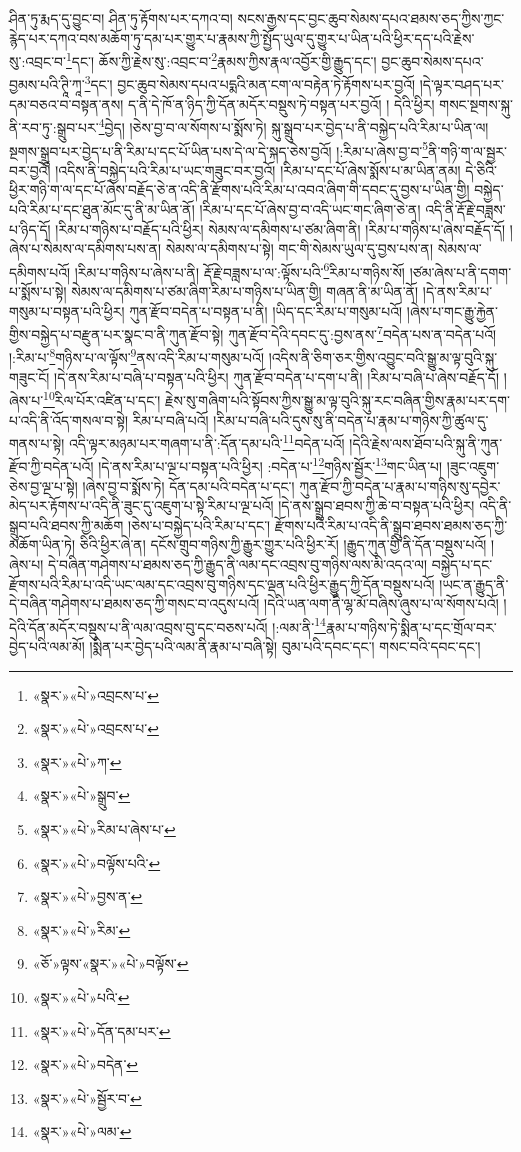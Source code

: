 ཤིན་ཏུ་རྨད་དུ་བྱུང་བ། ཤིན་ཏུ་རྟོགས་པར་དཀའ་བ། སངས་རྒྱས་དང་བྱང་ཆུབ་སེམས་དཔའ་ཐམས་ཅད་ཀྱིས་ཀྱང་རྙེད་པར་དཀའ་བས་མཆོག་ཏུ་དམ་པར་གྱུར་པ་རྣམས་ཀྱི་སྤྱོད་ཡུལ་དུ་གྱུར་པ་ཡིན་པའི་ཕྱིར་དད་པའི་རྗེས་སུ་:འབྲང་བ་\footnote{«སྣར་»«པེ་»འབྲངས་པ་}དང་། ཆོས་ཀྱི་རྗེས་སུ་:འབྲང་བ་\footnote{«སྣར་»«པེ་»འབྲངས་པ་}རྣམས་ཀྱིས་རྣལ་འབྱོར་གྱི་རྒྱུད་དང་། བྱང་ཆུབ་སེམས་དཔའ་བྱམས་པའི་ཊཱི་ཀཱ་\footnote{«སྣར་»«པེ་»ཀ་}དང་། བྱང་ཆུབ་སེམས་དཔའ་པདྨའི་མན་ངག་ལ་བརྟེན་ཏེ་རྟོགས་པར་བྱའོ། །དེ་ལྟར་བཤད་པར་དམ་བཅའ་བ་བསྟན་ནས། ད་ནི་དེ་ཁོ་ན་ཉིད་ཀྱི་དོན་མདོར་བསྡུས་ཏེ་བསྟན་པར་བྱའོ། །
དེའི་ཕྱིར། གསང་སྔགས་སྐུ་ནི་རབ་ཏུ་:སྒྲུབ་པར་\footnote{«སྣར་»«པེ་»སྒྲུབ་}བྱེད། །ཅེས་བྱ་བ་ལ་སོགས་པ་སྨོས་ཏེ། སྐུ་སྒྲུབ་པར་བྱེད་པ་ནི་བསྐྱེད་པའི་རིམ་པ་ཡིན་ལ། སྔགས་སྒྲུབ་པར་བྱེད་པ་ནི་རིམ་པ་དང་པོ་ཡིན་པས་དེ་ལ་དེ་སྐད་ཅེས་བྱའོ། །:རིམ་པ་ཞེས་བྱ་བ་\footnote{«སྣར་»«པེ་»རིམ་པ་ཞེས་པ་}ནི་གཉི་ག་ལ་སྦྱར་བར་བྱའོ། །འདིས་ནི་བསྐྱེད་པའི་རིམ་པ་ཡང་གཟུང་བར་བྱའོ། །རིམ་པ་དང་པོ་ཞེས་སྨོས་པ་མ་ཡིན་ནམ། དེ་ཅིའི་ཕྱིར་གཉི་ག་ལ་དང་པོ་ཞེས་བརྗོད་ཅེ་ན་འདི་ནི་རྫོགས་པའི་རིམ་པ་འབའ་ཞིག་གི་དབང་དུ་བྱས་པ་ཡིན་གྱི། བསྐྱེད་པའི་རིམ་པ་དང་ཐུན་མོང་དུ་ནི་མ་ཡིན་ནོ། །རིམ་པ་དང་པོ་ཞེས་བྱ་བ་འདི་ཡང་གང་ཞིག་ཅེ་ན། འདི་ནི་རྡོ་རྗེ་བཟླས་པ་ཉིད་དོ། །རིམ་པ་གཉིས་པ་བརྗོད་པའི་ཕྱིར། སེམས་ལ་དམིགས་པ་ཙམ་ཞིག་ནི། །རིམ་པ་གཉིས་པ་ཞེས་བརྗོད་དོ། །ཞེས་པ་སེམས་ལ་དམིགས་པས་ན། སེམས་ལ་དམིགས་པ་སྟེ། གང་གི་སེམས་ཡུལ་དུ་བྱས་པས་ན། སེམས་ལ་དམིགས་པའོ། །རིམ་པ་གཉིས་པ་ཞེས་པ་ནི། རྡོ་རྗེ་བཟླས་པ་ལ་:ལྟོས་པའི་\footnote{«སྣར་»«པེ་»བལྟོས་པའི་}རིམ་པ་གཉིས་སོ། །ཙམ་ཞེས་པ་ནི་དགག་པ་སྨོས་པ་སྟེ། སེམས་ལ་དམིགས་པ་ཙམ་ཞིག་རིམ་པ་གཉིས་པ་ཡིན་གྱི། གཞན་ནི་མ་ཡིན་ནོ། །དེ་ནས་རིམ་པ་གསུམ་པ་བསྟན་པའི་ཕྱིར། ཀུན་རྫོབ་བདེན་པ་བསྟན་པ་ནི། །ཡིད་དང་རིམ་པ་གསུམ་པའོ། །ཞེས་པ་གང་རྒྱུ་རྐྱེན་གྱིས་བསྐྱེད་པ་བརྫུན་པར་སྣང་བ་ནི་ཀུན་རྫོབ་སྟེ། ཀུན་རྫོབ་དེའི་དབང་དུ་:བྱས་ནས་\footnote{«སྣར་»«པེ་»བྱས་ན་}བདེན་པས་ན་བདེན་པའོ། །:རིམ་པ་\footnote{«སྣར་»«པེ་»རིམ་}གཉིས་པ་ལ་ལྟོས་\footnote{«ཅོ་»ལྟས་«སྣར་»«པེ་»བལྟོས་}ནས་འདི་རིམ་པ་གསུམ་པའོ། །འདིས་ནི་ཅིག་ཅར་གྱིས་འབྱུང་བའི་སྒྱུ་མ་ལྟ་བུའི་སྐུ་གཟུང་ངོ། །དེ་ནས་རིམ་པ་བཞི་པ་བསྟན་པའི་ཕྱིར། ཀུན་རྫོབ་བདེན་པ་དག་པ་ནི། །རིམ་པ་བཞི་པ་ཞེས་བརྗོད་དོ། །ཞེས་པ་\footnote{«སྣར་»«པེ་»པའི་}རིལ་པོར་འཛིན་པ་དང་། རྗེས་སུ་གཞིག་པའི་སྟོབས་ཀྱིས་སྒྱུ་མ་ལྟ་བུའི་སྐུ་རང་བཞིན་གྱིས་རྣམ་པར་དག་པ་འདི་ནི་འོད་གསལ་བ་སྟེ། རིམ་པ་བཞི་པའོ། །རིམ་པ་བཞི་པའི་དུས་སུ་ནི་བདེན་པ་རྣམ་པ་གཉིས་ཀྱི་ཚུལ་དུ་གནས་པ་སྟེ། འདི་ལྟར་མཉམ་པར་གཞག་པ་ནི་:དོན་དམ་པའི་\footnote{«སྣར་»«པེ་»དོན་དམ་པར་}བདེན་པའོ། །དེའི་རྗེས་ལས་ཐོབ་པའི་སྐུ་ནི་ཀུན་རྫོབ་ཀྱི་བདེན་པའོ། །དེ་ནས་རིམ་པ་ལྔ་པ་བསྟན་པའི་ཕྱིར། :བདེན་པ་\footnote{«སྣར་»«པེ་»བདེན་}གཉིས་སྦྱོར་\footnote{«སྣར་»«པེ་»སྦྱོར་བ་}གང་ཡིན་པ། །ཟུང་འཇུག་ཅེས་བྱ་ལྔ་པ་སྟེ། །ཞེས་བྱ་བ་སྨོས་ཏེ། དོན་དམ་པའི་བདེན་པ་དང་། ཀུན་རྫོབ་ཀྱི་བདེན་པ་རྣམ་པ་གཉིས་སུ་དབྱེར་མེད་པར་རྟོགས་པ་འདི་ནི་ཟུང་དུ་འཇུག་པ་སྟེ་རིམ་པ་ལྔ་པའོ། །དེ་ནས་སྒྲུབ་ཐབས་ཀྱི་ཆེ་བ་བསྟན་པའི་ཕྱིར། འདི་ནི་སྒྲུབ་པའི་ཐབས་ཀྱི་མཆོག །ཅེས་པ་བསྐྱེད་པའི་རིམ་པ་དང་། རྫོགས་པའི་རིམ་པ་འདི་ནི་སྒྲུབ་ཐབས་ཐམས་ཅད་ཀྱི་མཆོག་ཡིན་ཏེ། ཅིའི་ཕྱིར་ཞེ་ན། དངོས་གྲུབ་གཉིས་ཀྱི་རྒྱུར་གྱུར་པའི་ཕྱིར་རོ། །རྒྱུད་ཀུན་གྱི་ནི་དོན་བསྡུས་པའོ། །ཞེས་པ། དེ་བཞིན་གཤེགས་པ་ཐམས་ཅད་ཀྱི་རྒྱུད་ནི་ལམ་དང་འབྲས་བུ་གཉིས་ལས་མི་འདའ་ལ། བསྐྱེད་པ་དང་རྫོགས་པའི་རིམ་པ་འདི་ཡང་ལམ་དང་འབྲས་བུ་གཉིས་དང་ལྡན་པའི་ཕྱིར་རྒྱུད་ཀྱི་དོན་བསྡུས་པའོ། །ཡང་ན་རྒྱུད་ནི་དེ་བཞིན་གཤེགས་པ་ཐམས་ཅད་ཀྱི་གསང་བ་འདུས་པའོ། །དེའི་ཡན་ལག་ནི་ལྷ་མོ་བཞིས་ཞུས་པ་ལ་སོགས་པའོ། །དེའི་དོན་མདོར་བསྡུས་པ་ནི་ལམ་འབྲས་བུ་དང་བཅས་པའོ། །:ལམ་ནི་\footnote{«སྣར་»«པེ་»ལམ་}རྣམ་པ་གཉིས་ཏེ་སྨིན་པ་དང་གྲོལ་བར་བྱེད་པའི་ལམ་མོ། །སྨིན་པར་བྱེད་པའི་ལམ་ནི་རྣམ་པ་བཞི་སྟེ། བུམ་པའི་དབང་དང་། གསང་བའི་དབང་དང་། 
